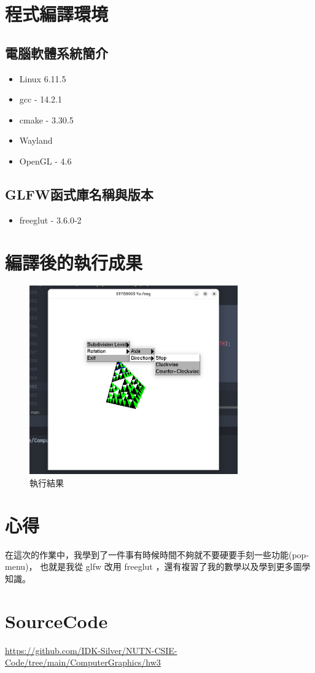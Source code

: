 \documentclass[12pt,a4paper]{article}
\begin{document}
\section*{程式編譯環境}
\subsection*{電腦軟體系統簡介}
\begin{itemize}
  \item Linux 6.11.5
  \item gcc - 14.2.1
  \item cmake - 3.30.5
  \item Wayland
  \item OpenGL - 4.6 
\end{itemize}



\subsection*{GLFW函式庫名稱與版本}

\begin{itemize}
  \item freeglut - 3.6.0-2 
\end{itemize}
\newpage
\section*{編譯後的執行成果}
\begin{figure}[h]
  \centering
  \includegraphics[width=0.8\textwidth]{img/hw3_result.png}
  \caption{執行結果}
\end{figure}

\section*{心得}
在這次的作業中，我學到了一件事有時候時間不夠就不要硬要手刻一些功能(pop-menu)，
也就是我從 glfw 改用 freeglut ，還有複習了我的數學以及學到更多圖學知識。

\section*{SourceCode}
\sloppy
\noindent \url{https://github.com/IDK-Silver/NUTN-CSIE-Code/tree/main/ComputerGraphics/hw3}
\end{document}

